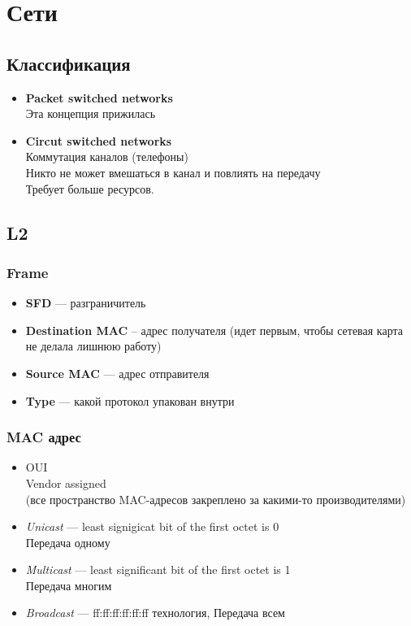\documentclass[../../lectures.tex]{subfiles}
\begin{document}
\chapter{Сети}

\section{Классификация}
\begin{itemize} 
    \item \textbf{Packet switched networks}\\ Эта концепция прижилась
    \item \textbf{Circut switched networks}\\ Коммутация каналов (телефоны)\\
          Никто не может вмешаться в канал и повлиять на передачу\\
          Требует больше ресурсов.
\end{itemize}

\section{L2}
\subsection{Frame}
\begin{itemize}
    \item \textbf{SFD} --- разграничитель
    \item \textbf{Destination MAC} -- адрес получателя (идет первым, чтобы сетевая карта не делала лишнюю работу)
    \item \textbf{Source MAC} --- адрес отправителя
    \item \textbf{Type} --- какой протокол упакован внутри
\end{itemize}

\subsection{MAC адрес}
\begin{itemize}
    \item OUI\\
          Vendor assigned\\
          (все пространство MAC-адресов закреплено за какими-то производителями)
    \item \emph{Unicast} --- least signigicat bit of the first octet is 0\\
          Передача одному
    \item \emph{Multicast} --- least significant bit of the first octet is 1\\
          Передача многим
    \item \emph{Broadcast} --- ff:ff:ff:ff:ff:ff технология, 
          Передача всем \end{itemize} 
\end{document}
